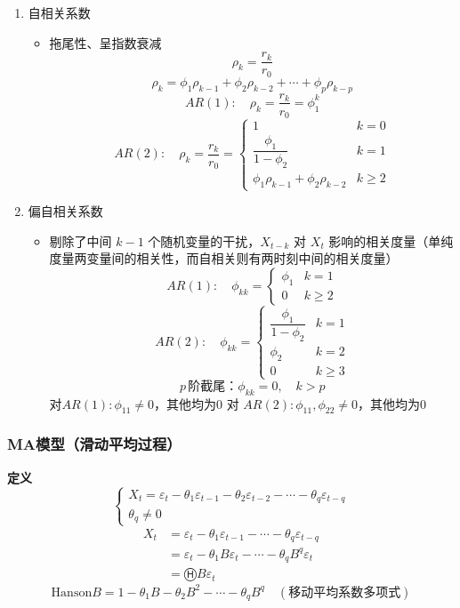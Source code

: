 \documentclass{article} %
\begin{document}
\begin{enumerate}
\begin{itemize}
\end{itemize}
\item 自相关系数
\begin{itemize}
\item 拖尾性、呈指数衰减
\[
\rho_k=\dfrac{r_k}{r_0}
\]
\[
\rho_{k}=\phi_{1}\rho_{k-1}+\phi_{2}\rho_{k-2}+\cdots+\phi_{p}\rho_{k-p}
\]
\[
AR(1):\quad \rho_{k}=\dfrac{r_{k}}{r_{0}}=\phi_{1}^{k}
\]
\[
AR(2):\quad\rho_{k}=\frac{r_{k}}{r_{0}}=\begin{cases}
1&k=0\\
\dfrac{\phi_{1}}{1-\phi_{2}}&k=1\\
{\phi_{1}\rho_{k-1}+\phi_{2}\rho_{k-2}}&k\geq2
\end{cases}
\]
\end{itemize}
\item 偏自相关系数
\begin{itemize}
\item 剔除了中间 $k-1$ 个随机变量的干扰，$X_{t-k}$ 对 $X_t$ 影响的相关度量（单纯度量两变量间的相关性，而自相关则有两时刻中间的相关度量）
\[
AR(1):\quad\phi_{kk}=\begin{cases}
\phi_{1}&k=1\\
0&k\geq 2
\end{cases}
\]
\[
AR(2):\quad \phi_{kk}=\begin{cases}
\dfrac{\phi_{1}}{1-\phi_{2}}&k=1\\
\phi_{2}&k=2\\
0&k\geq3
\end{cases}
\]
\[
p\,阶截尾：\phi_{kk}=0,\quad k>p
\]
对$AR(1):\phi_{11}\not =0$，其他均为0
对 $AR(2):\phi_{11},\phi_{22}\not = 0$，其他均为0
\end{itemize}
\end{enumerate}



\subsubsection{MA模型（滑动平均过程）}

\textbf{定义}
\[
\begin{cases}
X_t=\varepsilon_t-\theta_1\varepsilon_{t-1}-\theta_2\varepsilon_{t-2}-\cdots-\theta_q\varepsilon_{t-q}\\
\theta_q\not=0
\end{cases}
\]
\[
\begin{aligned}
X_t&=\varepsilon_t-\theta_1\varepsilon_{t-1}-\cdots-\theta_q\varepsilon_{t-q}\\
&=\varepsilon_t-\theta_1B\varepsilon_t-\cdots-\theta_qB^q\varepsilon_t\\
&=ⒽB\varepsilon_t
\end{aligned}
\]
\[
 \text{Hanson} B=1-\theta_1B-\theta_2B^2-\cdots-\theta_qB^q \quad (\text{移动平均系数多项式})
\]
\end{document}
